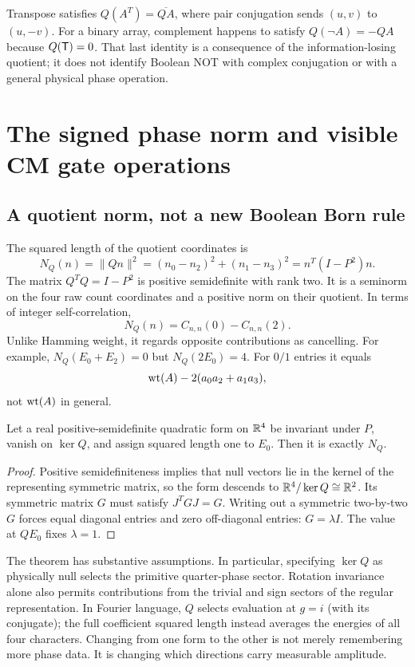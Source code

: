 Transpose satisfies $Q(A^T)=\overline{QA}$, where pair conjugation sends $(u,v)$ to $(u,-v)$. For a binary array, complement happens to satisfy $Q(\neg A)=-QA$ because $Q(\mathsf T)=0$. That last identity is a consequence of the information-losing quotient; it does not identify Boolean NOT with complex conjugation or with a general physical phase operation.

\section{The signed phase norm and visible CM gate operations}\label{sec:normlift}
\subsection{A quotient norm, not a new Boolean Born rule}
The squared length of the quotient coordinates is
\begin{equation}\label{eq:normQ}
 N_Q(n)=\|Qn\|^2=(n_0-n_2)^2+(n_1-n_3)^2
       =n^T(I-P^2)n.
\end{equation}
The matrix $Q^TQ=I-P^2$ is positive semidefinite with rank two. It is a seminorm on the four raw count coordinates and a positive norm on their quotient. In terms of integer self-correlation,
\begin{equation}
 N_Q(n)=C_{n,n}(0)-C_{n,n}(2).
\end{equation}
Unlike Hamming weight, it regards opposite contributions as cancelling. For example, $N_Q(E_0+E_2)=0$ but $N_Q(2E_0)=4$. For $0/1$ entries it equals
\begin{equation}
 \operatorname{wt}(A)-2(a_0a_2+a_1a_3),
\end{equation}
not $\operatorname{wt}(A)$ in general.

\begin{proposition}
Let a real positive-semidefinite quadratic form on $\mathbb R^4$ be invariant under $P$, vanish on $\ker Q$, and assign squared length one to $E_0$. Then it is exactly $N_Q$.
\end{proposition}
\begin{proof}
Positive semidefiniteness implies that null vectors lie in the kernel of the representing symmetric matrix, so the form descends to $\mathbb R^4/\ker Q\cong\mathbb R^2$. Its symmetric matrix $G$ must satisfy $J^TGJ=G$. Writing out a symmetric two-by-two $G$ forces equal diagonal entries and zero off-diagonal entries: $G=\lambda I$. The value at $QE_0$ fixes $\lambda=1$.
\end{proof}
The theorem has substantive assumptions. In particular, specifying $\ker Q$ as physically null selects the primitive quarter-phase sector. Rotation invariance alone also permits contributions from the trivial and sign sectors of the regular representation. In Fourier language, $Q$ selects evaluation at $g=i$ (with its conjugate); the full coefficient squared length instead averages the energies of all four characters. Changing from one form to the other is not merely remembering more phase data. It is changing which directions carry measurable amplitude.


